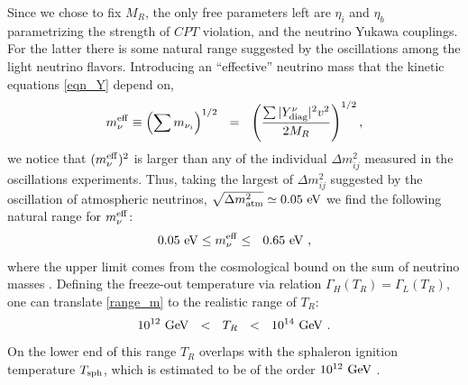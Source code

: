 \documentclass[12pt]{revtex4}
\newcommand{\lgr}{\left\lgroup}
\newcommand{\rgr}{\right\rgroup}
\newcommand{\Mpl}{M_{\rm Pl}}
\newcommand{\Tsph}{T_{\rm sph}}
\newcommand{\meff}{m^{\rm eff}_\nu}
\newcommand{\GeV}{{\rm GeV}}
\newcommand{\eV}{{\rm eV}}
\begin{document}
Since we chose to fix $M_R$, the only free parameters left are 
$\eta_i$ and $\eta_b$ parametrizing the strength of $CPT$ violation, 
and the neutrino Yukawa couplings. 
For the latter there is some natural range suggested by the 
oscillations among the light neutrino flavors. 
Introducing an ``effective'' neutrino mass that the kinetic equations 
\eqref{eqn_Y} depend on,
\begin{equation}
	\meff \equiv \left( \sum m_{\nu_i} \right)^{1/2}~~=~~ \left(\frac{\sum |Y^\nu_{\rm diag}|^2v^2}{2M_R}\right)^{1/2},
\end{equation}
we notice that $(\meff)^2$ is larger than any of the individual $\Delta m^2_{ij}$ measured 
in the oscillations experiments. Thus, taking the largest of $\Delta m^2_{ij}$ suggested by 
the oscillation of atmospheric neutrinos, 
$ \sqrt{\Delta m_{\rm atm}^2} \simeq 0.05~\eV $
\cite{Yao:2006px}
we find the following natural range for $\meff$:
\begin{equation}
\label{range_m}
	0.05~\eV\leq \meff\leq~~ 0.65~\eV~,
\end{equation}
where the upper limit comes from the cosmological
	bound on the sum of neutrino masses 
\cite{Hannestad:2003ye}.
	Defining the freeze-out temperature via relation
	$\Gamma_H(T_R)=\Gamma_L(T_R)$, one can translate 
	\eqref{range_m} to the realistic range of $T_R$:
		\begin{equation}
	10^{12}~\GeV ~~<~~ T_R ~~<~~ 10^{14}~\GeV~.
\end{equation}
		On the lower end of this range $ T_R $ overlaps with the 
	sphaleron ignition temperature $ \Tsph $, which is estimated
	to be of the order $ 10^{12}~\GeV $ \cite{Buchmuller:2005eh}.  
\end{document}
